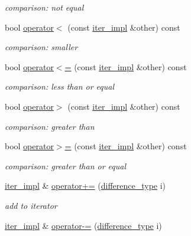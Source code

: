 \begin{DoxyCompactItemize}
\begin{DoxyCompactList}\small\item\em comparison\+: not equal \end{DoxyCompactList}\item 
bool \hyperlink{classnlohmann_1_1detail_1_1iter__impl_a3a5123a4cfe72a9d674c9ff65c4ec08c}{operator$<$} (const \hyperlink{classnlohmann_1_1detail_1_1iter__impl}{iter\+\_\+impl} \&other) const 
\begin{DoxyCompactList}\small\item\em comparison\+: smaller \end{DoxyCompactList}\item 
bool \hyperlink{classnlohmann_1_1detail_1_1iter__impl_aa90b4d1da290b5073778e295dc2985f3}{operator$<$=} (const \hyperlink{classnlohmann_1_1detail_1_1iter__impl}{iter\+\_\+impl} \&other) const 
\begin{DoxyCompactList}\small\item\em comparison\+: less than or equal \end{DoxyCompactList}\item 
bool \hyperlink{classnlohmann_1_1detail_1_1iter__impl_afe8894bea0a0b616d9d5975ca04e8b39}{operator$>$} (const \hyperlink{classnlohmann_1_1detail_1_1iter__impl}{iter\+\_\+impl} \&other) const 
\begin{DoxyCompactList}\small\item\em comparison\+: greater than \end{DoxyCompactList}\item 
bool \hyperlink{classnlohmann_1_1detail_1_1iter__impl_ae87ea99999c169722b388c69871295e3}{operator$>$=} (const \hyperlink{classnlohmann_1_1detail_1_1iter__impl}{iter\+\_\+impl} \&other) const 
\begin{DoxyCompactList}\small\item\em comparison\+: greater than or equal \end{DoxyCompactList}\item 
\hyperlink{classnlohmann_1_1detail_1_1iter__impl}{iter\+\_\+impl} \& \hyperlink{classnlohmann_1_1detail_1_1iter__impl_a3eef94f9d167046e7f773aeb6b78090c}{operator+=} (\hyperlink{classnlohmann_1_1detail_1_1iter__impl_a2f7ea9f7022850809c60fc3263775840}{difference\+\_\+type} i)
\begin{DoxyCompactList}\small\item\em add to iterator \end{DoxyCompactList}\item 
\hyperlink{classnlohmann_1_1detail_1_1iter__impl}{iter\+\_\+impl} \& \hyperlink{classnlohmann_1_1detail_1_1iter__impl_abcc9d51bc52f2e8483bbe4018f05e978}{operator-\/=} (\hyperlink{classnlohmann_1_1detail_1_1iter__impl_a2f7ea9f7022850809c60fc3263775840}{difference\+\_\+type} i)

\end{DoxyCompactItemize}
